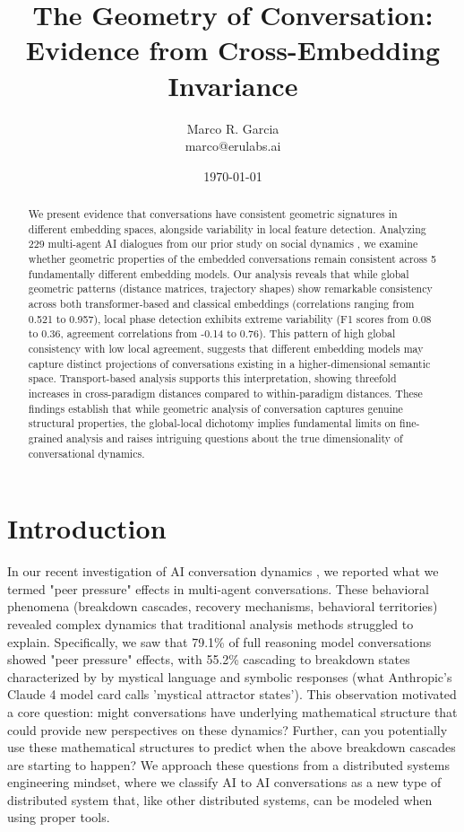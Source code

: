 \documentclass[11pt,letterpaper]{article}
\title{The Geometry of Conversation: Evidence from Cross-Embedding Invariance}
\author{
Marco R. Garcia \\
marco@erulabs.ai
}
\date{\today}
\newcommand{\totalConversations}{229}
\newcommand{\numEmbeddingModels}{5}
\newcommand{\minPairwiseCorr}{0.521}
\newcommand{\maxPairwiseCorr}{0.957}
\begin{document}
\maketitle

\begin{abstract}
We present evidence that conversations have consistent geometric signatures in different embedding spaces, alongside variability in local feature detection. Analyzing \totalConversations{} multi-agent AI dialogues from our prior study on social dynamics \citep{garcia2025peer}, we examine whether geometric properties of the embedded conversations remain consistent across \numEmbeddingModels{} fundamentally different embedding models. Our analysis reveals that while global geometric patterns (distance matrices, trajectory shapes) show remarkable consistency across both transformer-based and classical embeddings (correlations ranging from \minPairwiseCorr{} to \maxPairwiseCorr{}), local phase detection exhibits extreme variability (F1 scores from 0.08 to 0.36, agreement correlations from -0.14 to 0.76). This pattern of high global consistency with low local agreement, suggests that different embedding models may capture distinct projections of conversations existing in a higher-dimensional semantic space. Transport-based analysis supports this interpretation, showing threefold increases in cross-paradigm distances compared to within-paradigm distances. These findings establish that while geometric analysis of conversation captures genuine structural properties, the global-local dichotomy implies fundamental limits on fine-grained analysis and raises intriguing questions about the true dimensionality of conversational dynamics.
\end{abstract}

\section{Introduction}

In our recent investigation of AI conversation dynamics \citep{garcia2025peer}, we reported what we termed "peer pressure" effects in multi-agent conversations. These behavioral phenomena (breakdown cascades, recovery mechanisms, behavioral territories) revealed complex dynamics that traditional analysis methods struggled to explain. Specifically, we saw that 79.1\% of full reasoning model conversations showed "peer pressure" effects, with 55.2\% cascading to breakdown states characterized by
by mystical language and symbolic responses (what Anthropic's Claude 4 model card calls 'mystical attractor states'). This observation motivated a core question: might conversations have underlying mathematical structure that could provide new perspectives on these dynamics? Further, can you potentially use these mathematical structures to predict when the above breakdown cascades are starting to happen? We approach these questions from a distributed systems engineering mindset, where we classify AI to AI conversations as a new type of distributed system that, like other distributed systems, can be modeled when using proper tools. 
\end{document}
